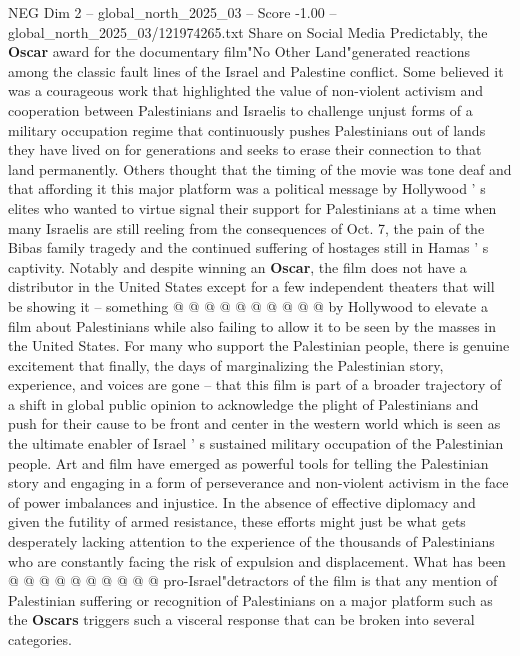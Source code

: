 \begin{textsample}{NEG Dim 2 – global\_north\_2025\_03 – Score -1.00 – global\_north\_2025\_03/121974265.txt}  \label{ex:f2_neg_027}
Share on Social Media Predictably, the \textbf{Oscar} award for the documentary film"No Other Land"generated reactions among the classic fault lines of the Israel and Palestine conflict.
Some believed it was a courageous work that highlighted the value of non-violent activism and cooperation between Palestinians and Israelis to challenge unjust forms of a military occupation regime that continuously pushes Palestinians out of lands they have lived on for generations and seeks to erase their connection to that land permanently.
Others thought that the timing of the movie was tone deaf and that affording it this major platform was a political message by Hollywood ' s elites who wanted to virtue signal their support for Palestinians at a time when many Israelis are still reeling from the consequences of Oct. 7, the pain of the Bibas family tragedy and the continued suffering of hostages still in Hamas ' s captivity.
Notably and despite winning an \textbf{Oscar}, the film does not have a distributor in the United States except for a few independent theaters that will be showing it -- something @ @ @ @ @ @ @ @ @ @ by Hollywood to elevate a film about Palestinians while also failing to allow it to be seen by the masses in the United States.
For many who support the Palestinian people, there is genuine excitement that finally, the days of marginalizing the Palestinian story, experience, and voices are gone -- that this film is part of a broader trajectory of a shift in global public opinion to acknowledge the plight of Palestinians and push for their cause to be front and center in the western world which is seen as the ultimate enabler of Israel ' s sustained military occupation of the Palestinian people.
Art and film have emerged as powerful tools for telling the Palestinian story and engaging in a form of perseverance and non-violent activism in the face of power imbalances and injustice.
In the absence of effective diplomacy and given the futility of armed resistance, these efforts might just be what gets desperately lacking attention to the experience of the thousands of Palestinians who are constantly facing the risk of expulsion and displacement.
What has been @ @ @ @ @ @ @ @ @ @ pro-Israel"detractors of the film is that any mention of Palestinian suffering or recognition of Palestinians on a major platform such as the \textbf{Oscars} triggers such a visceral response that can be broken into several categories.

\end{textsample}
